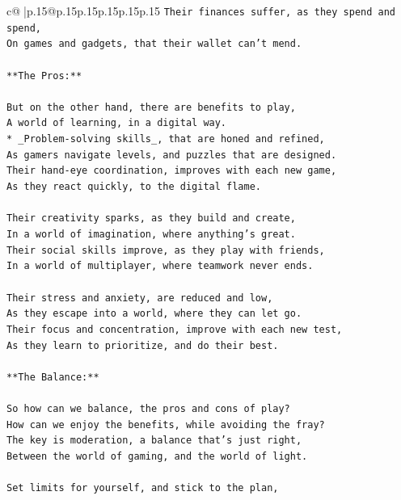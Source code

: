 \documentclass{article}
\begin{document}
{\begin{supertabular}{c@{$\;$}|p{.15\linewidth}@{}p{.15\linewidth}p{.15\linewidth}p{.15\linewidth}p{.15\linewidth}p{.15\linewidth}}
{{{\texttt{Their finances suffer, as they spend and spend,} \\
\texttt{On games and gadgets, that their wallet can't mend.} \\
\\ 
\texttt{**The Pros:**} \\
\\ 
\texttt{But on the other hand, there are benefits to play,} \\
\texttt{A world of learning, in a digital way.} \\
\texttt{* \_Problem{-}solving skills\_, that are honed and refined,} \\
\texttt{As gamers navigate levels, and puzzles that are designed.} \\
\texttt{Their hand{-}eye coordination, improves with each new game,} \\
\texttt{As they react quickly, to the digital flame.} \\
\\ 
\texttt{Their creativity sparks, as they build and create,} \\
\texttt{In a world of imagination, where anything's great.} \\
\texttt{Their social skills improve, as they play with friends,} \\
\texttt{In a world of multiplayer, where teamwork never ends.} \\
\\ 
\texttt{Their stress and anxiety, are reduced and low,} \\
\texttt{As they escape into a world, where they can let go.} \\
\texttt{Their focus and concentration, improve with each new test,} \\
\texttt{As they learn to prioritize, and do their best.} \\
\\ 
\texttt{**The Balance:**} \\
\\ 
\texttt{So how can we balance, the pros and cons of play?} \\
\texttt{How can we enjoy the benefits, while avoiding the fray?} \\
\texttt{The key is moderation, a balance that's just right,} \\
\texttt{Between the world of gaming, and the world of light.} \\
\\ 
\texttt{Set limits for yourself, and stick to the plan,} \\
}}}
\end{supertabular}}
\end{document}
